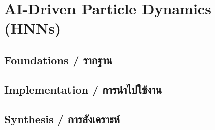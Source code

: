 \chapter{AI-Driven Particle Dynamics (HNNs)}
\label{ch:particle_dynamics}

\section{Foundations \quad / \quad \textthai{รากฐาน}}



\section{Implementation \quad / \quad \textthai{การนำไปใช้งาน}}



\section{Synthesis \quad / \quad \textthai{การสังเคราะห์}}



